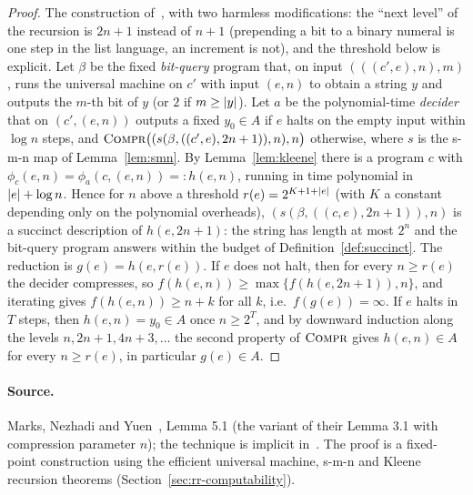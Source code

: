 \begin{proof}
\leanok
The construction of~\cite{MNY}, with two harmless modifications: the ``next level'' of
the recursion is $2n + 1$ instead of $n + 1$ (prepending a bit to a binary numeral is one
step in the list language, an increment is not), and the threshold below is explicit.
Let $\beta$ be the fixed \emph{bit-query} program that, on input $(((c', e), n), m)$,
runs the universal machine on $c'$ with input $(e, n)$ to obtain a string $y$ and outputs
the $m$-th bit of $y$ (or $2$ if $m \geq \left\vert {y} \right\vert$). Let $a$ be the polynomial-time
\emph{decider} that on $(c', (e, n))$ outputs a fixed $y_0 \in A$ if $e$ halts on the
empty input within $\log n$ steps, and $\textsc{Compr}\bigl((s(\beta, ((c', e), 2n+1)), n),
n\bigr)$ otherwise, where $s$ is the s-m-n map of Lemma~\ref{lem:smn}. By
Lemma~\ref{lem:kleene} there is a program $c$ with $\phi_c(e, n) = \phi_a(c, (e, n))
=: h(e, n)$, running in time polynomial in $\left\vert {e} \right\vert + \log n$. Hence for $n$ above a
threshold $r(e) = 2^{K + 1 + \left\vert {e} \right\vert}$ (with $K$ a constant depending only on the
polynomial overheads), $(s(\beta, ((c, e), 2n+1)), n)$ is a succinct description of
$h(e, 2n+1)$: the string has length at most $2^n$ and the bit-query program answers within
the budget of Definition~\ref{def:succinct}. The reduction is $g(e) = h(e, r(e))$. If $e$
does not halt, then for every $n \geq r(e)$ the decider compresses, so $f(h(e, n)) \geq
\max\{f(h(e, 2n+1)), n\}$, and iterating gives $f(h(e, n)) \geq n + k$ for all $k$,
i.e.\ $f(g(e)) = \infty$. If $e$ halts in $T$ steps, then $h(e, n) = y_0 \in A$ once
$n \geq 2^T$, and by downward induction along the levels $n, 2n+1, 4n + 3, \ldots$ the
second property of $\textsc{Compr}$ gives $h(e, n) \in A$ for every $n \geq r(e)$, in particular
$g(e) \in A$.
\end{proof}

\paragraph{Source.} Marks, Nezhadi and Yuen~\cite{MNY}, Lemma 5.1 (the variant of
their Lemma 3.1 with compression parameter $n$); the technique is implicit
in~\cite{DRS08,FJVY19,JNVWY20}. The proof is a fixed-point construction using the
efficient universal machine, s-m-n and Kleene recursion theorems
(Section~\ref{sec:rr-computability}).

